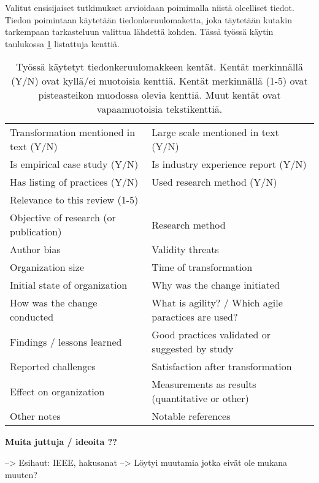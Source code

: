 Valitut ensisijaiset tutkimukset arvioidaan poimimalla niistä oleelliset tiedot.
Tiedon poimintaan käytetään tiedonkeruulomaketta, joka täytetään kutakin
tarkempaan tarkasteluun valittua lähdettä kohden. Tässä työssä käytin taulukossa
\ref{table:dataform} listattuja kenttiä.

\begin{table}
    \begin{tabular}{|l|l|}
        \hline
        Transformation mentioned in text (Y/N) &
        Large scale mentioned in text (Y/N) \\
        Is empirical case study (Y/N) &
        Is industry experience report (Y/N) \\
        Has listing of practices (Y/N) &
        Used research method (Y/N) \\
        Relevance to this review (1-5) & \\
        Objective of research (or publication) &
        Research method \\
        Author bias &
        Validity threats \\
        Organization size &
        Time of transformation \\
        Initial state of organization &
        Why was the change initiated \\
        How was the change conducted &
        What is agility? / Which agile paractices are used? \\
        Findings / lessons learned &
        Good practices validated or suggested by study \\
        Reported challenges &
        Satisfaction after transformation \\
        Effect on organization &
        Measurements as results (quantitative or other) \\
        Other notes &
        Notable references \\
        \hline
    \end{tabular}
    \caption{Työssä käytetyt tiedonkeruulomakkeen kentät. Kentät merkinnällä
    (Y/N) ovat kyllä/ei muotoisia kenttiä. Kentät merkinnällä (1-5) ovat
    pisteasteikon muodossa olevia kenttiä. Muut kentät ovat vapaamuotoisia
    tekstikenttiä.}
    \label{table:dataform}
\end{table}


\vspace{1cm}
\textbf{Muita juttuja / ideoita ??}

--> Esihaut: IEEE, hakusanat --> Löytyi muutamia jotka eivät ole mukana muuten?

